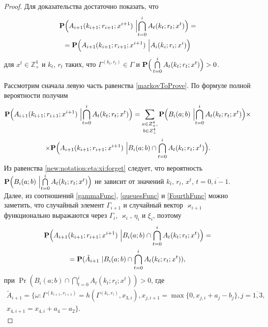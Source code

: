 \begin{proof}
Для доказательства достаточно показать,  что 
\begin{multline}
\Pr \Bigl( A_{i+1}(k_{i+1};r_{i+1};x^{i+1})\, \,  \Bigl|\bigcap_{t=0}^{i} A_t(k_t;r_t;x^{t})\Bigr.\Bigr) = \\ = \Pr \Bigl( A_{i+1}(k_{i+1};r_{i+1};x^{i+1})\, \,   \Bigl|A_i(k_i;r_i;x^{i})\Bigr.\Bigr)
\label{markovToProve}
\end{multline}
для $x^t \in {\mathbb Z}_+^4$ и $k_t$,  $r_t$ таких,  что $\Gamma^{(k_t, r_t)}\in \Gamma$ и $\Pr \Bigl(\,  \bigcap\limits_{t=0}^{i} A_t(k_t;r_t;x^{t})\Bigr)>0 $.

Рассмотрим сначала левую часть равенства \eqref{markovToProve}. По формуле полной вероятности получим
\begin{multline}
\Pr \Bigl( A_{i+1}(k_{i+1};r_{i+1};x^{i+1}) \, \,  \Bigl|\bigcap_{t=0}^{i} A_t(k_t;r_t;x^{t})\Bigr.\Bigr) 
= \sum_{\substack{a\in Z^4_+, \\ b\in Z^4_+}}\Pr \Bigl( B_i(a;b) \, \,  \Bigl|\bigcap_{t=0}^{i} A_t(k_t;r_t;x^{t})\Bigr.\Bigr)\times\\
\times \Pr \Bigl( A_{i+1}(k_{i+1};r_{i+1};x^{i+1}) \, \,  \Bigl|B_i(a;b) \cap \bigcap_{t=0}^{i} A_t(k_t;r_t;x^{t})\Bigr.\Bigr).
\label{markovProof}
\end{multline}
Из равенства \eqref{new:notation:eta:xi:forget} следует,  что вероятность  $\Pr \Bigl( B_i(a;b) \, \,   \Bigl| \bigcap\limits_{t=0}^{i} A_t(k_t;r_t;x^{t})\Bigr)$ не зависит от значений $k_t$,  $r_t$,  $x^{t}$,  $t=\overline{0, i-1}$.
Далее,  из соотношений \eqref{gammaFunc},  \eqref{queuesFunc} и \eqref{FourthFunc} можно заметить,  что случайный элемент $\Gamma_{i+1}$ и случайный вектор $\varkappa_{i+1}$ функционально выражаются через $\Gamma_i$,  $\varkappa_i$,  $\eta_i$ и $\xi_i$,  поэтому 
\begin{multline*}
\Pr \Bigl( A_{i+1}(k_{i+1};r_{i+1};x^{i+1})\, \,   \Bigl|B_i(a;b) \cap \bigcap_{t=0}^{i} A_t(k_t;r_t;x^{t})\Bigr.\Bigr) =\\= \Pr ( \tilde{A}_{i+1} \, \,  |B_i(a;b) \cap \bigcap_{t=0}^{i} A_t(k_t;r_t;x^{t})),     
\end{multline*}
при $\Pr (B_i(a;b) \cap \bigcap_{t=0}^{i} A_t(k_t;r_t;x^{t}))>0$,  где 
\begin{multline*}
\tilde{A}_{i+1} = \{\omega\colon\Gamma^{(k_{i+1},  r_{i+1})}=h(\Gamma^{(k_i,  r_i)},  x_{3,  i}),  x_{j,  i+1}=\max\{0, x_{j,  i}+a_{j}-b_{j}\},  j=\overline{1,  3}, \\ x_{4,  i+1}=x_{4,  i}+a_{4}-a_2\}.

\end{multline*}
\end{proof}
